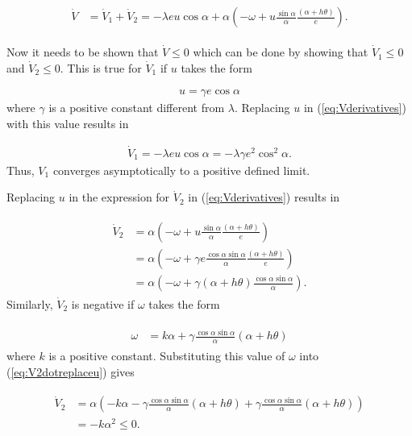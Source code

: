 \begin{align}
\label{eq:lyapunovfunctionderivative}
\begin{split}
\dot{V} &= \dot{V}_1 + \dot{V}_2 = -\lambda e u\cos\alpha + \alpha\left(-\omega+u\frac{\sin\alpha}{\alpha}\frac{(\alpha+h\theta)}{e}\right).
\end{split}
\end{align}

Now it needs to be shown that $\dot{V}\leq0$ which can be done by showing that $\dot{V}_1\leq0$ and $\dot{V}_2\leq0$. This is true for $\dot{V}_1$ if $u$ takes the form

\begin{align}
\label{eq:lyapunovu}
u = \gamma e\cos\alpha
\end{align}
where $\gamma$ is a positive constant different from $\lambda$. Replacing $u$ in (\ref{eq:Vderivatives}) with this value results in

\begin{align}
\label{eq:V1dotfinal}
\dot{V}_1 = -\lambda eu\cos\alpha = -\lambda\gamma e^2\cos^2\alpha.
\end{align}
Thus, $V_1$ converges asymptotically to a positive defined limit.

Replacing $u$ in the expression for $\dot{V}_2$ in (\ref{eq:Vderivatives}) results in

\begin{align}
\label{eq:V2dotreplaceu}
\begin{split}
\dot{V}_2 &= \alpha\left(-\omega+u\frac{\sin\alpha}{\alpha}\frac{(\alpha+h\theta)}{e}\right) \\
&= \alpha\left(-\omega+\gamma e\frac{\cos\alpha\sin\alpha}{\alpha}\frac{(\alpha+h\theta)}{e}\right) \\
&= \alpha\left(-\omega+\gamma(\alpha+h\theta)\frac{\cos\alpha\sin\alpha}{\alpha}\right).
\end{split}
\end{align}
Similarly, $\dot{V}_2$ is negative if $\omega$ takes the form

\begin{align}
\label{eq:lyapunovomega}
\begin{split}
\omega &= k\alpha + \gamma\frac{\cos\alpha\sin\alpha}{\alpha}\left(\alpha+h\theta\right)
\end{split}
\end{align}
where $k$ is a positive constant. Substituting this value of $\omega$ into (\ref{eq:V2dotreplaceu}) gives

\begin{align}
\label{eq:V2dotfinal}
\begin{split}
\dot{V}_2 &= \alpha\left(-k\alpha-\gamma\frac{\cos\alpha\sin\alpha}{\alpha}(\alpha+h\theta) + \gamma\frac{\cos\alpha\sin\alpha}{\alpha}(\alpha+h\theta)\right) \\
&= -k\alpha^2 \leq 0.
\end{split}
\end{align}


